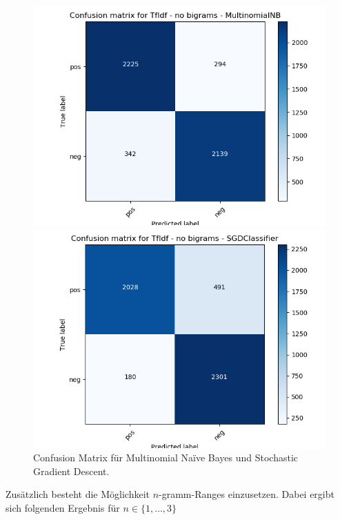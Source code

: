 \documentclass[12pt]{scrartcl}
\begin{document}
    \begin{figure}[h]
        \begin{minipage}{0.45\textwidth}
            \includegraphics[scale=.35]{pictures/tfidf_nb_mnb.png}
        \end{minipage}
        \hfill
        \begin{minipage}{0.45\textwidth}
            \includegraphics[scale=.35]{pictures/tfidf_nb_sgd.png}
        \end{minipage}
        \caption{Confusion Matrix für Multinomial Naïve Bayes und Stochastic Gradient Descent.}
    \end{figure}

    Zusätzlich besteht die Möglichkeit $n$-gramm-Ranges einzusetzen.
    Dabei ergibt sich folgenden Ergebnis für $n \in \{1,\dots, 3\}$
\end{document}
